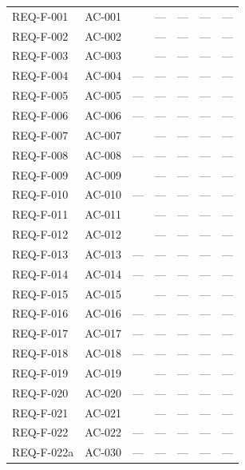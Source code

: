 \begin{longtable}{L{2.0cm} L{1.8cm} L{2.8cm} L{1.6cm} L{1.6cm} L{1.6cm} L{1.6cm}}
REQ-F-001 & AC-001 &            & --- & --- & --- & --- \\
REQ-F-002 & AC-002 &       & --- & --- & --- & --- \\
REQ-F-003 & AC-003 &      & --- & --- & --- & --- \\
REQ-F-004 & AC-004 & ---                          & --- & --- & --- & --- \\
REQ-F-005 & AC-005 & ---                          & --- & --- & --- & --- \\
REQ-F-006 & AC-006 & ---                          & --- & --- & --- & --- \\
REQ-F-007 & AC-007 &         & --- & --- & --- & --- \\
REQ-F-008 & AC-008 & ---                          & --- & --- & --- & --- \\
REQ-F-009 & AC-009 &      & --- & --- & --- & --- \\
REQ-F-010 & AC-010 & ---                          & --- & --- & --- & --- \\
REQ-F-011 & AC-011 &         & --- & --- & --- & --- \\
REQ-F-012 & AC-012 &     & --- & --- & --- & --- \\
REQ-F-013 & AC-013 & ---                          & --- & --- & --- & --- \\
REQ-F-014 & AC-014 & ---                          & --- & --- & --- & --- \\
REQ-F-015 & AC-015 &  & --- & --- & --- & --- \\
REQ-F-016 & AC-016 & ---                          & --- & --- & --- & --- \\
REQ-F-017 & AC-017 & ---                          & --- & --- & --- & --- \\
REQ-F-018 & AC-018 & ---                          & --- & --- & --- & --- \\
REQ-F-019 & AC-019 &  & --- & --- & --- & --- \\
REQ-F-020 & AC-020 & ---                          & --- & --- & --- & --- \\
REQ-F-021 & AC-021 &        & --- & --- & --- & --- \\
REQ-F-022 & AC-022 & ---                          & --- & --- & --- & --- \\
REQ-F-022a & AC-030 & ---                         & --- & --- & --- & --- \\

\end{longtable}
